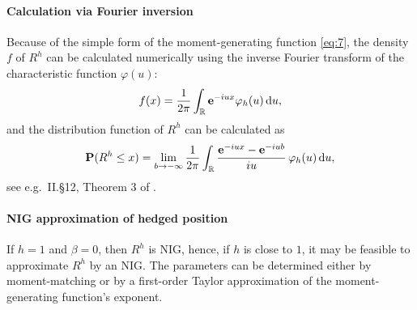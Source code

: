 
\paragraph*{Calculation via Fourier inversion}
\label{sec:calc-via-four}

Because of the simple form of the moment-generating function
\eqref{eq:7}, the density $f$ of $R^h$ can be calculated numerically
using the inverse Fourier transform of the characteristic function
$\varphi(u) $:
\begin{equation*}
  f(x) = \frac{1}{2\pi} \int_{\mathbb{R}} {\bf e}^{-i u x} \varphi_h(u)\, {\rm d} u, 
\end{equation*}
and the distribution function of $R^h$ can be calculated as
\begin{equation*}
  {\bf P}(R^h\leq x) = \lim_{b\rightarrow-\infty} \frac{1}{2\pi} \int_{\mathbb{R}}
  \frac{{\bf e}^{-i u x} - {\bf e}^{-i u b}}{i u}\, \varphi_h(u)\, {\rm d} u,
\end{equation*}
see e.g.\ II.\S 12, Theorem 3 of \citep{Shiryaev1996}.


\paragraph*{NIG approximation of hedged position}
\label{sec:nig-appr-hedg}

If $h=1$ and $\beta=0$, then $R^h$ is NIG, hence, if $h$ is close to
$1$, it may be feasible to approximate $R^h$ by an NIG. The parameters
can be determined either by moment-matching or by a first-order Taylor
approximation of the moment-generating function's exponent.


